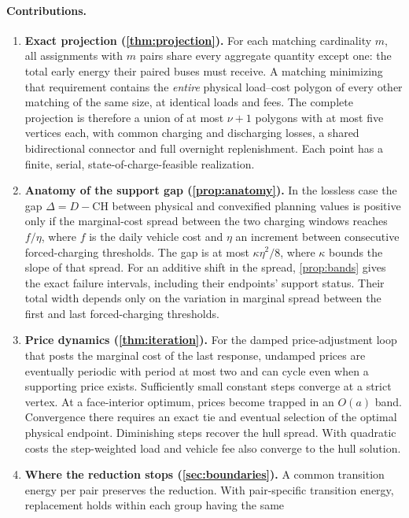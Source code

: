 \documentclass[11pt]{article}
\theoremstyle{definition}\newtheorem{definition}[theorem]{Definition}
\theoremstyle{remark}\newtheorem{remark}[theorem]{Remark}
\newcommand{\CH}{\mathrm{CH}}
\begin{document}
\paragraph{Contributions.}
\begin{enumerate}[leftmargin=*,itemsep=2pt]
\item \textbf{Exact projection (\cref{thm:projection}).} For each matching
cardinality $m$, all assignments with $m$ pairs share every aggregate quantity
except one: the total early energy their paired buses must receive. A
matching minimizing that requirement contains the \emph{entire} physical
load--cost polygon of every other matching of the same size, at identical loads
and fees. The complete projection is therefore a union of at most $\nu+1$
polygons with at most five vertices each, with common charging and discharging
losses, a shared bidirectional connector and full overnight replenishment. Each
point has a finite, serial, state-of-charge-feasible realization.
\item \textbf{Anatomy of the support gap (\cref{prop:anatomy}).} In the
lossless case the gap $\Delta=D-\CH$ between physical and convexified planning
values is positive only if the marginal-cost spread between the two charging
windows reaches $f/\eta$, where $f$ is the daily vehicle cost and $\eta$ an
increment between consecutive forced-charging thresholds. The gap is at most
$\kappa\eta^2/8$, where $\kappa$ bounds the slope of that spread.
For an additive shift in the spread, \cref{prop:bands} gives the exact
failure intervals, including their endpoints' support status. Their total
width depends only on the variation in marginal spread between the first
and last forced-charging thresholds.
\item \textbf{Price dynamics (\cref{thm:iteration}).} For the damped
price-adjustment loop that posts the marginal cost of the last response, undamped
prices are eventually periodic with period at most two and can cycle even when a
supporting price exists. Sufficiently small constant steps converge at a
strict vertex. At a face-interior optimum, prices become trapped in an $O(a)$
band. Convergence there requires an exact tie and eventual selection of the
optimal physical endpoint. Diminishing steps recover the hull spread. With
quadratic costs the step-weighted load and vehicle fee also converge to the
hull solution.
\item \textbf{Where the reduction stops (\cref{sec:boundaries}).} A common
transition energy per pair preserves the reduction. With pair-specific
transition energy, replacement holds within each group having the same

\end{enumerate}
\end{document}
